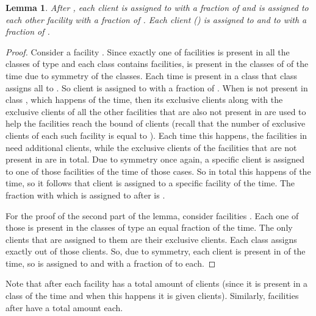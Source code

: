 \documentclass[11pt]{article}\usepackage{amsmath}
\newtheorem{lemma}{Lemma}[section]
\begin{document}
\begin{lemma}  \label{lemma:roundA}
After  ,  each client      is
assigned to   with a fraction of  and is
assigned to each other facility    with a
fraction of . Each client  ()   is   assigned   to    and to  
 with   a   fraction   of .
\end{lemma}

\begin{proof}
Consider a facility  . Since exactly one of facilities   is present in
all the classes of type   and each class contains  facilities,
 is  present in the  classes of    of
the time due to symmetry of the classes. Each time  is present in
a class   that  class  assigns  all  to
.  So  client    is  assigned  to   with  a  fraction  of
. When   is not  present in  class ,
which happens   of the time, then  its exclusive clients
along with  the exclusive  clients of all  the other   facilities
that  are also  not  present in    are used  to  help the  
facilities   reach the bound  of clients (recall
that the number of exclusive clients of each such facility is equal to
).  Each time  this happens, the  facilities  in  need
  additional clients, while  the exclusive  clients of  the 
facilities that are  not present in  are   in total. Due
to symmetry  once again, a  specific client  is
assigned to  one of those   facilities 
of the  time of those cases.  So in total  this happens  of  the
time, so it follows that client  is assigned to a specific facility
    of the
time. The fraction with which   is assigned to  after 
is .

For  the proof  of the  second part  of the  lemma,  consider facilities
. Each one of those is present in the classes of type  an equal 
fraction  of the time. The
only clients that  are assigned to them are  their exclusive clients. Each
class  assigns exactly  out of those  clients. So,
due to symmetry, each client  is present in
   of the time,  so  is assigned to  and 
with a fraction of  to each.
\end{proof}

Note that  after  each  facility  has  a total
amount   of clients (since it is present
in a class   of the time and  when this happens
it is  given  clients).  Similarly, facilities   after 
have a total amount  each.
\end{document}
